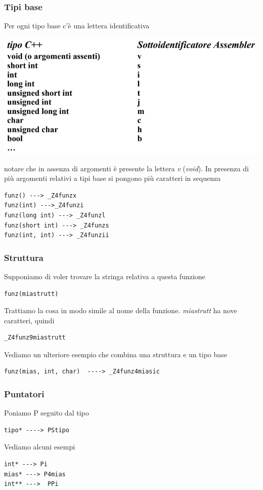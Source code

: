 \documentclass[11pt]{report}
\theoremstyle{definition}
\begin{document}
\subsubsection{Tipi base} Per ogni tipo base c'è una lettera identificativa
\begin{center}
\includegraphics[scale=0.70]{img/38.PNG}
\end{center}  
notare che in assenza di argomenti è presente la lettera \emph{v} (\emph{void}). In presenza di più argomenti relativi a tipi base si pongono più caratteri in sequenza
\begin{verbatim}
funz() ---> _Z4funzx
funz(int) --->_Z4funzi
funz(long int) ---> _Z4funzl
funz(short int) ---> _Z4funzs
funz(int, int) ---> _Z4funzii
\end{verbatim}
\subsubsection{Struttura} Supponiamo di voler trovare la stringa relativa a questa funzione
\begin{verbatim}
funz(miastrutt)
\end{verbatim}
Trattiamo la cosa in modo simile al nome della funzione. \emph{miastrutt} ha nove caratteri, quindi
\begin{verbatim}
_Z4funz9miastrutt
\end{verbatim}
Vediamo un ulteriore esempio che combina una struttura e un tipo base
\begin{verbatim}
funz(mias, int, char)  ----> _Z4funz4miasic
\end{verbatim}
\subsubsection{Puntatori}
Poniamo P seguito dal tipo
\begin{verbatim}
tipo* ----> PStipo
\end{verbatim}
Vediamo alcuni esempi
\begin{verbatim}
int* ---> Pi
mias* ---> P4mias
int** --->  PPi
\end{verbatim}
\end{document}
